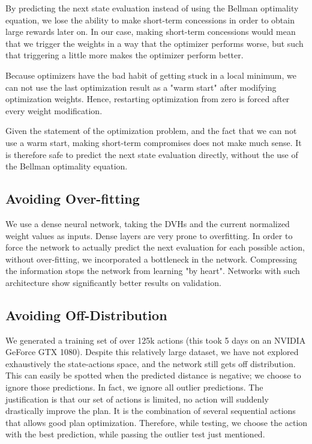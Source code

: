 By predicting the next state evaluation instead of using the Bellman optimality equation, we lose the ability to make short-term concessions in order to obtain large rewards later on.
In our case, making short-term concessions would mean that we trigger the weights in a way that the optimizer performs worse, but such that triggering a little more makes the optimizer perform better.

Because optimizers have the bad habit of getting stuck in a local minimum, we can not use the last optimization result as a "warm start" after modifying optimization weights.
Hence, restarting optimization from zero is forced after every weight modification.

Given the statement of the optimization problem, and the fact that we can not use a warm start, making short-term compromises does not make much sense.
It is therefore safe to predict the next state evaluation directly, without the use of the Bellman optimality equation.

\subsection{Avoiding Over-fitting}
We use a dense neural network, taking the DVHs and the current normalized weight values as inputs.
Dense layers are very prone to overfitting.
In order to force the network to actually predict the next evaluation for each possible action, without over-fitting, we incorporated a bottleneck in the network.
Compressing the information stops the network from learning "by heart".
Networks with such architecture show significantly better results on validation.

\subsection{Avoiding Off-Distribution}
We generated a training set of over 125k actions (this took 5 days on an NVIDIA GeForce GTX 1080).
Despite this relatively large dataset, we have not explored exhaustively the state-actions space, and the network still gets off distribution.
This can easily be spotted when the predicted distance is negative; we choose to ignore those predictions.
In fact, we ignore all outlier predictions.
The justification is that our set of actions is limited, no action will suddenly drastically improve the plan.
It is the combination of several sequential actions that allows good plan optimization.
Therefore, while testing, we choose the action with the best prediction, while passing the outlier test just mentioned.


